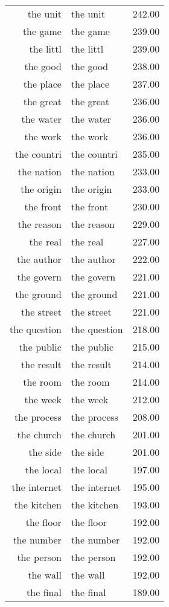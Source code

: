\begin{table}[ht]
\begin{tabular}{rlr}
  the unit & the unit & 242.00 \\ 
  the game & the game & 239.00 \\ 
  the littl & the littl & 239.00 \\ 
  the good & the good & 238.00 \\ 
  the place & the place & 237.00 \\ 
  the great & the great & 236.00 \\ 
  the water & the water & 236.00 \\ 
  the work & the work & 236.00 \\ 
  the countri & the countri & 235.00 \\ 
  the nation & the nation & 233.00 \\ 
  the origin & the origin & 233.00 \\ 
  the front & the front & 230.00 \\ 
  the reason & the reason & 229.00 \\ 
  the real & the real & 227.00 \\ 
  the author & the author & 222.00 \\ 
  the govern & the govern & 221.00 \\ 
  the ground & the ground & 221.00 \\ 
  the street & the street & 221.00 \\ 
  the question & the question & 218.00 \\ 
  the public & the public & 215.00 \\ 
  the result & the result & 214.00 \\ 
  the room & the room & 214.00 \\ 
  the week & the week & 212.00 \\ 
  the process & the process & 208.00 \\ 
  the church & the church & 201.00 \\ 
  the side & the side & 201.00 \\ 
  the local & the local & 197.00 \\ 
  the internet & the internet & 195.00 \\ 
  the kitchen & the kitchen & 193.00 \\ 
  the floor & the floor & 192.00 \\ 
  the number & the number & 192.00 \\ 
  the person & the person & 192.00 \\ 
  the wall & the wall & 192.00 \\ 
  the final & the final & 189.00 \\ 

\end{tabular}
\end{table}
